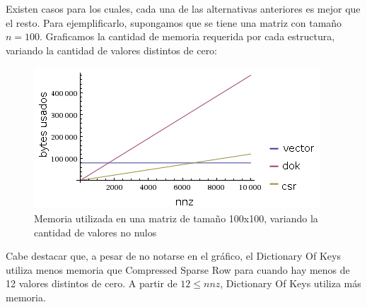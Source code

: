 Existen casos para los cuales, cada una de las alternativas anteriores es mejor que el resto. Para ejemplificarlo, supongamos que se tiene una matriz con tamaño $n=100$. Graficamos la cantidad de memoria requerida por cada estructura, variando la cantidad de valores distintos de cero: \\

\begin{figure}
  \vspace{-20pt}
  \begin{center}
    \includegraphics[scale= 0.6]{imagenes/n100espacio.png}
  \end{center}
  \vspace{-20pt}
   \caption[Caption espacio n 100]{Memoria utilizada en una matriz de tamaño 100x100, variando la cantidad de valores no nulos}
  \vspace{-10pt}
  \label{fig:img1}
\end{figure}

Cabe destacar que, a pesar de no notarse en el gráfico, el Dictionary Of Keys utiliza menos memoria que Compressed Sparse Row para cuando hay menos de 12 valores distintos de cero. A partir de $12 \leq nnz$, Dictionary Of Keys utiliza más memoria.
